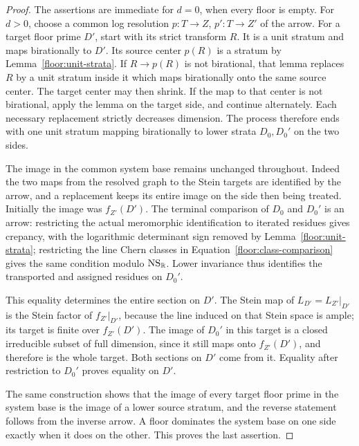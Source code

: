 \begin{proof}
The assertions are immediate for \(d=0\), when every floor is empty.
For \(d>0\), choose a common log resolution
\(p:T\to Z\), \(p':T\to Z'\) of the arrow.  For a target floor prime
\(D'\), start with its strict transform \(R\).  It is a unit stratum and
maps birationally to \(D'\).  Its source center \(p(R)\) is a stratum by
Lemma~\ref{floor:unit-strata}.  If \(R\to p(R)\) is not birational, that
lemma replaces \(R\) by a unit stratum inside it which maps birationally
onto the same source center.  The target center may then shrink.  If the
map to that center is not birational, apply the lemma on the target side,
and continue alternately.  Each necessary replacement strictly decreases
dimension.  The process therefore ends with one unit stratum mapping
birationally to lower strata \(D_0,D_0'\) on the two sides.

The image in the common system base remains unchanged throughout.  Indeed
the two maps from the resolved graph to the Stein targets are identified
by the arrow, and a replacement keeps its entire image on the side then
being treated.  Initially the image was \(f_{Z'}(D')\).  The terminal
comparison of \(D_0\) and \(D_0'\) is an arrow: restricting the actual
meromorphic identification to iterated residues gives crepancy, with the
logarithmic determinant sign removed by Lemma~\ref{floor:unit-strata};
restricting the line Chern classes in Equation~\eqref{floor:class-comparison}
gives the same condition modulo \(\operatorname{NS}_{\mathbb R}\).  Lower invariance thus
identifies the transported and assigned residues on \(D_0'\).

This equality determines the entire section on \(D'\).  The Stein map
of \(L_{D'}=L_{Z'}|_{D'}\) is the Stein factor of
\(f_{Z'}|_{D'}\), because the line induced on that Stein space is ample;
its target is finite over \(f_{Z'}(D')\).  The image of \(D_0'\) in this
target is a closed irreducible subset of full dimension, since it still
maps onto \(f_{Z'}(D')\), and therefore is the whole target.  Both
sections on \(D'\) come from it.  Equality after restriction to
\(D_0'\) proves equality on \(D'\).

The same construction shows that the image of every target floor prime
in the system base is the image of a lower source stratum, and the reverse
statement follows from the inverse arrow.  A floor dominates the system
base on one side exactly when it does on the other.  This proves the last
assertion.
\end{proof}

